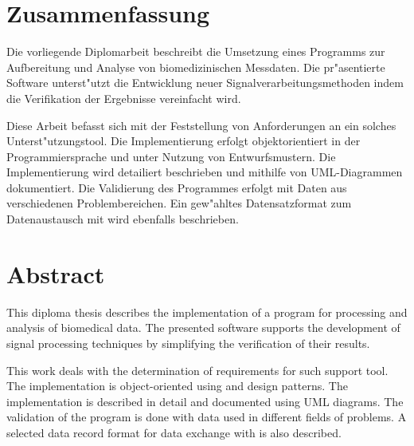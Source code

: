 \clearpage
\section*{Zusammenfassung}

Die vorliegende Diplomarbeit beschreibt die Umsetzung eines Programms zur Aufbereitung und Analyse von biomedizinischen Messdaten.
Die pr"asentierte Software unterst"utzt die Entwicklung neuer Signalverarbeitungsmethoden indem die Verifikation der Ergebnisse vereinfacht wird.

Diese Arbeit befasst sich mit der Feststellung von Anforderungen an ein solches Unterst"utzungstool.
Die Implementierung erfolgt objektorientiert in der Programmiersprache \java und unter Nutzung von Entwurfsmustern.
Die Implementierung wird detailiert beschrieben und mithilfe von UML-Diagrammen dokumentiert.
Die Validierung des Programmes erfolgt mit Daten aus verschiedenen Problembereichen.
Ein gew"ahltes Datensatzformat \us zum Datenaustausch mit \ml wird ebenfalls beschrieben.

\section*{Abstract}

This diploma thesis describes the implementation of a program for processing and analysis of biomedical data.
The presented software supports the development of signal processing techniques by simplifying the verification of their results.

This work deals with the determination of requirements for such support tool.
The implementation is object-oriented using \java and design patterns.
The implementation is described in detail and documented using UML diagrams.
The validation of the program is done with data used in different fields of problems.
A selected data record format \us for data exchange with \ml is also described.
